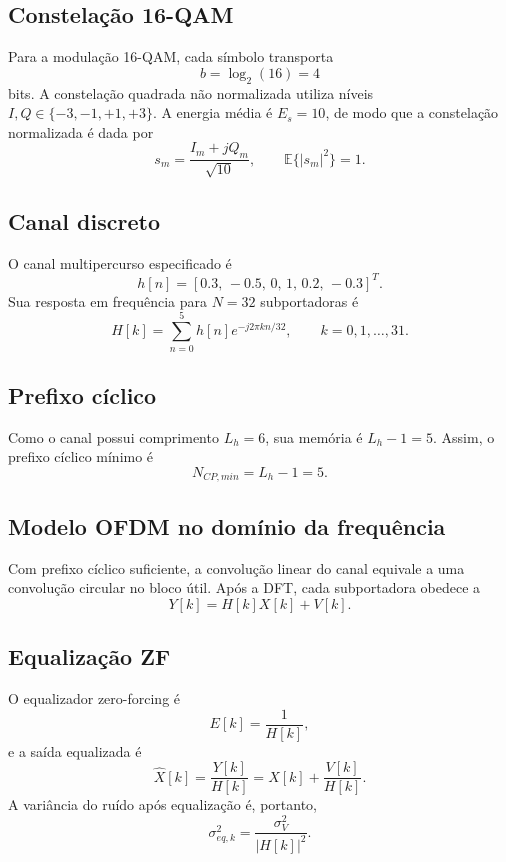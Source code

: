 
\subsection{Constelação 16-QAM}
Para a modulação 16-QAM, cada símbolo transporta
\begin{equation}
    b = \log_2(16)=4
\end{equation}
bits. A constelação quadrada não normalizada utiliza níveis $I,Q\in\{-3,-1,+1,+3\}$. A energia média é $E_s=10$, de modo que a constelação normalizada é dada por
\begin{equation}
    s_m = \frac{I_m+jQ_m}{\sqrt{10}}, \qquad \mathbb{E}\{|s_m|^2\}=1.
\end{equation}

\subsection{Canal discreto}
O canal multipercurso especificado é
\begin{equation}
    h[n]=[0.3,\,-0.5,\,0,\,1,\,0.2,\,-0.3]^T.
\end{equation}
Sua resposta em frequência para $N=32$ subportadoras é
\begin{equation}
    H[k]=\sum_{n=0}^{5} h[n]e^{-j2\pi kn/32}, \qquad k=0,1,\ldots,31.
\end{equation}

\subsection{Prefixo cíclico}
Como o canal possui comprimento $L_h=6$, sua memória é $L_h-1=5$. Assim, o prefixo cíclico mínimo é
\begin{equation}
    N_{CP,min}=L_h-1=5.
\end{equation}

\subsection{Modelo OFDM no domínio da frequência}
Com prefixo cíclico suficiente, a convolução linear do canal equivale a uma convolução circular no bloco útil. Após a DFT, cada subportadora obedece a
\begin{equation}
    Y[k]=H[k]X[k]+V[k].
\end{equation}

\subsection{Equalização ZF}
O equalizador zero-forcing é
\begin{equation}
    E[k]=\frac{1}{H[k]},
\end{equation}
e a saída equalizada é
\begin{equation}
    \hat{X}[k]=\frac{Y[k]}{H[k]}=X[k]+\frac{V[k]}{H[k]}.
\end{equation}
A variância do ruído após equalização é, portanto,
\begin{equation}
    \sigma_{eq,k}^{2}=\frac{\sigma_V^2}{|H[k]|^2}.
\end{equation}

